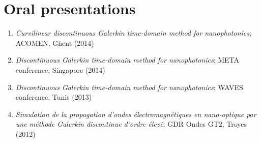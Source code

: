\section*{Oral presentations}

\begin{enumerate}
	\item \textit{Curvilinear discontinuous Galerkin time-domain method for nanophotonics}; ACOMEN, Ghent (2014)
	\item \textit{Discontinuous Galerkin time-domain method for nanophotonics}; META conference, Singapore (2014)
	\item \textit{Discontinuous Galerkin time-domain method for nanophotonics}; WAVES conference, Tunis (2013)
	\item \textit{Simulation de la propagation d'ondes \'electromagn\'etiques en nano-optique par une m\'ethode Galerkin discontinue d'ordre \'elev\'e}; GDR Ondes GT2, Troyes (2012)
\end{enumerate}
